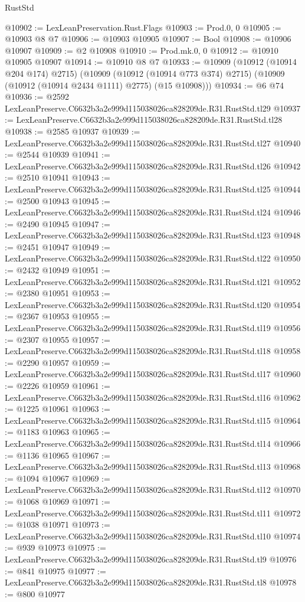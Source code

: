 \begin{lexlean}{RustStd}
\begin{coremodule}
@10902 := LexLeanPreservation.Rust.Flags
@10903 := Prod.{0, 0}
@10905 := @10903 @8 @7
@10906 := @10903 @10905
@10907 := Bool
@10908 := @10906 @10907
@10909 := @2 @10908
@10910 := Prod.mk.{0, 0}
@10912 := @10910 @10905 @10907
@10914 := @10910 @8 @7
@10933 := @10909
    (@10912 (@10914 @204 @174) @2715)
    (@10909
      (@10912 (@10914 @773 @374) @2715)
      (@10909 (@10912 (@10914 @2434 @1111) @2775) (@15 @10908)))
@10934 := @6 @74
@10936 := @2592 LexLeanPreserve.C6632b3a2e999d115038026ca828209de.R31.RustStd.tl29
@10937 := LexLeanPreserve.C6632b3a2e999d115038026ca828209de.R31.RustStd.tl28
@10938 := @2585 @10937
@10939 := LexLeanPreserve.C6632b3a2e999d115038026ca828209de.R31.RustStd.tl27
@10940 := @2544 @10939
@10941 := LexLeanPreserve.C6632b3a2e999d115038026ca828209de.R31.RustStd.tl26
@10942 := @2510 @10941
@10943 := LexLeanPreserve.C6632b3a2e999d115038026ca828209de.R31.RustStd.tl25
@10944 := @2500 @10943
@10945 := LexLeanPreserve.C6632b3a2e999d115038026ca828209de.R31.RustStd.tl24
@10946 := @2490 @10945
@10947 := LexLeanPreserve.C6632b3a2e999d115038026ca828209de.R31.RustStd.tl23
@10948 := @2451 @10947
@10949 := LexLeanPreserve.C6632b3a2e999d115038026ca828209de.R31.RustStd.tl22
@10950 := @2432 @10949
@10951 := LexLeanPreserve.C6632b3a2e999d115038026ca828209de.R31.RustStd.tl21
@10952 := @2380 @10951
@10953 := LexLeanPreserve.C6632b3a2e999d115038026ca828209de.R31.RustStd.tl20
@10954 := @2367 @10953
@10955 := LexLeanPreserve.C6632b3a2e999d115038026ca828209de.R31.RustStd.tl19
@10956 := @2307 @10955
@10957 := LexLeanPreserve.C6632b3a2e999d115038026ca828209de.R31.RustStd.tl18
@10958 := @2290 @10957
@10959 := LexLeanPreserve.C6632b3a2e999d115038026ca828209de.R31.RustStd.tl17
@10960 := @2226 @10959
@10961 := LexLeanPreserve.C6632b3a2e999d115038026ca828209de.R31.RustStd.tl16
@10962 := @1225 @10961
@10963 := LexLeanPreserve.C6632b3a2e999d115038026ca828209de.R31.RustStd.tl15
@10964 := @1183 @10963
@10965 := LexLeanPreserve.C6632b3a2e999d115038026ca828209de.R31.RustStd.tl14
@10966 := @1136 @10965
@10967 := LexLeanPreserve.C6632b3a2e999d115038026ca828209de.R31.RustStd.tl13
@10968 := @1094 @10967
@10969 := LexLeanPreserve.C6632b3a2e999d115038026ca828209de.R31.RustStd.tl12
@10970 := @1068 @10969
@10971 := LexLeanPreserve.C6632b3a2e999d115038026ca828209de.R31.RustStd.tl11
@10972 := @1038 @10971
@10973 := LexLeanPreserve.C6632b3a2e999d115038026ca828209de.R31.RustStd.tl10
@10974 := @939 @10973
@10975 := LexLeanPreserve.C6632b3a2e999d115038026ca828209de.R31.RustStd.tl9
@10976 := @841 @10975
@10977 := LexLeanPreserve.C6632b3a2e999d115038026ca828209de.R31.RustStd.tl8
@10978 := @800 @10977

\end{coremodule}
\end{lexlean}
